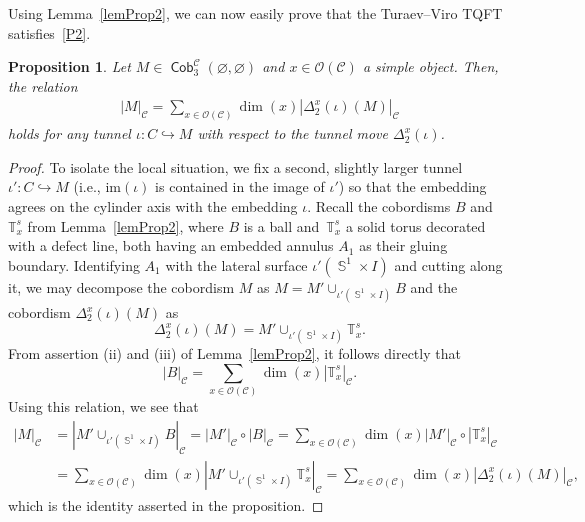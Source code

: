 \documentclass[pdftex]{sigma}
\DeclareMathOperator{\Sp}{\mathbb{S}}
\DeclareMathOperator{\Cob}{\mathsf{Cob}}
\numberwithin{equation}{section}
\newtheorem{Proposition}[Proposition]{Proposition}
\theoremstyle{definition}
\begin{document}
Using Lemma~\ref{lemProp2}, we can now easily prove that the Turaev--Viro TQFT satisfies~\ref{P2}.
\begin{Proposition}
 \label{propProp2}
 Let $M \in \Cob_3^{\mathcal{C}}(\varnothing, \varnothing)$ and $x \in \mathcal{O}(\mathcal{C})$ a simple object. Then, the relation
 \begin{align*}
 |M|_{\mathcal{C}} = \sum_{x \in \mathcal{O}(\mathcal{C})}\dim(x)|\Delta_2^x(\iota)(M)|_{\mathcal{C}}
 \end{align*}
 holds for any tunnel $\iota\colon C \hookrightarrow M$ with respect to the tunnel move $\Delta_2^x(\iota)$.
\end{Proposition}
\begin{proof}
To isolate the local situation, we fix a second, slightly larger tunnel $\iota'\colon C \hookrightarrow M$ (i.e., $\mathrm{im}(\iota)$ is contained in the image of $\iota'$) so that the embedding agrees on the cylinder axis with the embedding $\iota$. Recall the cobordisms $B$ and $\mathbb{T}_x^s$ from Lemma~\ref{lemProp2}, where $B$ is a ball and~$\mathbb{T}_x^s$ a solid torus decorated with a defect line, both having an embedded annulus $A_1$ as their gluing boundary. Identifying $A_1$ with the lateral surface $\iota'(\Sp^1 \times I)$ and cutting along it, we may decompose the cobordism $M$ as $M = M' \cup_{\iota'(\Sp^1 \times I)}B$ and the cobordism $\Delta_2^x(\iota)(M)$ as
\[
\Delta_2^x(\iota)(M) = M' \cup_{\iota' (\Sp^1 \times I )} \mathbb{T}_x^s.
\] From assertion (ii) and (iii) of Lemma~\ref{lemProp2}, it follows directly that
\[
|B|_{\mathcal{C}} = \sum_{x \in \mathcal{O}(\mathcal{C})}\dim(x) |\mathbb{T}_x^s|_{\mathcal{C}}.
\] Using this relation, we see that
\begin{align*}
 |M|_{\mathcal{C}} &= |M' \cup_{\iota'(\Sp^1 \times I)}B|_{\mathcal{C}} = |M'|_{\mathcal{C}} \circ |B|_{\mathcal{C}} = \sum_{x \in \mathcal{O}(\mathcal{C})}\dim(x)|M'|_{\mathcal{C}} \circ |\mathbb{T}_x^s|_{\mathcal{C}} \\
 &= \sum_{x \in \mathcal{O}(\mathcal{C})}\dim(x)|M'\cup_{\iota'(\Sp^1 \times I)}\mathbb{T}_x^s|_{\mathcal{C}} = \sum_{x \in \mathcal{O}(\mathcal{C})}\dim(x) |\Delta_2^x(\iota)(M)|_{\mathcal{C}},
\end{align*}
which is the identity asserted in the proposition.
\end{proof}
\end{document}
